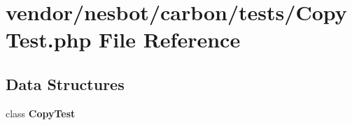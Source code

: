 \section{vendor/nesbot/carbon/tests/\+Copy\+Test.php File Reference}
\label{_copy_test_8php}
\subsection*{Data Structures}
\begin{DoxyCompactItemize}
\item 
class {\bf Copy\+Test}
\end{DoxyCompactItemize}
